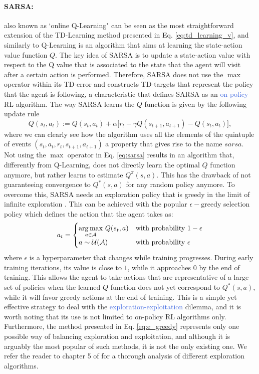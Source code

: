 \paragraph{SARSA:} also known as `online Q-Learning" \cite{rummery1994line} can be seen as the most straightforward extension of the TD-Learning method presented in Eq. \ref{eq:td_learning_v}, and similarly to Q-Learning is an algorithm that aims at learning the state-action value function $Q$. The key idea of SARSA is to update a state-action value with respect to the Q value that is associated to the state that the agent will visit after a certain action is performed. Therefore, SARSA does not use the $\max$ operator within its TD-error and constructs TD-targets that represent the policy that the agent is following, a characteristic that defines SARSA as an \textcolor{RoyalBlue}{on-policy} RL algorithm. The way SARSA learns the $Q$ function is given by the following update rule
\begin{equation}
	Q(s_t,a_t):=Q(s_t,a_t) + \alpha\big[r_t + \gamma Q(s_{t+1},a_{t+1}) - Q(s_t, a_t) \big], 
	\label{eq:sarsa}
\end{equation}
where we can clearly see how the algorithm uses all the elements of the quintuple of events $(s_t, a_t, r_t, s_{t+1}, a_{t+1})$ a property that gives rise to the name $sarsa$. Not using the $\max$ operator in Eq. \ref{eq:sarsa} results in an algorithm that, differently from Q-Learning, does not directly learn the optimal $Q$ function anymore, but rather learns to estimate $Q^{\pi}(s,a)$. This has the drawback of not guaranteeing convergence to $Q^{*}(s,a)$ for any random policy anymore. To overcome this, SARSA needs an exploration policy that is greedy in the limit of infinite exploration \cite{singh2000convergence}. This can be achieved with the popular $\epsilon-\text{greedy}$ selection policy which defines the action that the agent takes as:
\begin{equation}
a_t = \begin{cases}
\underset{a\in\mathcal{A}}{\operatorname*{arg\,max}} \ Q(s_t,a) &\text{with probability $1-\epsilon$}\\
a \sim \mathcal{U}(\mathcal{A}) &\text{with probability $\epsilon$}
\end{cases}
\label{eq:e_greedy}
\end{equation}
where $\epsilon$ is a hyperparameter that changes while training progresses. During early training iterations, its value is close to $1$, while it approaches $0$ by the end of training. This allows the agent to take actions that are representative of a large set of policies when the learned $Q$ function does not yet correspond to $Q^{*}(s,a)$, while it will favor greedy actions at the end of training. This is a simple yet effective strategy to deal with the \textcolor{RoyalBlue}{exploration-exploitation} dilemma, and it is worth noting that its use is not limited to on-policy RL algorithms only. Furthermore, the method presented in Eq. \ref{eq:e_greedy} represents only one possible way of balancing exploration and exploitation, and although it is arguably the most popular of such methods, it is not the only existing one. We refer the reader to chapter 5 of \cite{wiering1999explorations} for a thorough analysis of different exploration algorithms.

